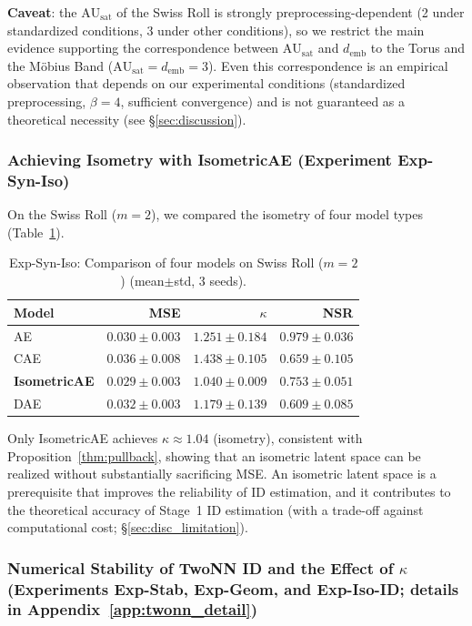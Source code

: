 \documentclass[make,article,submit,pdftex,moreauthors]{Definitions/mdpi}
\newcommand{\kap}{\kappa}
\newcommand{\AUsat}{\mathrm{AU}_{\mathrm{sat}}}
\newcommand{\demb}{d_{\mathrm{emb}}}
\begin{document}
\textbf{Caveat}: the $\AUsat$ of the Swiss Roll is strongly preprocessing-dependent
(2 under standardized conditions, 3 under other conditions), so we restrict the main
evidence supporting the correspondence between $\AUsat$ and $\demb$ to the Torus and
the M\"obius Band ($\AUsat = \demb = 3$).
Even this correspondence is an empirical observation that depends on our experimental
conditions (standardized preprocessing, $\beta = 4$, sufficient convergence) and is not
guaranteed as a theoretical necessity (see \S\ref{sec:discussion}).

\subsubsection{Achieving Isometry with IsometricAE (Experiment Exp-Syn-Iso)}

On the Swiss Roll ($m = 2$), we compared the isometry of four model types (Table~\ref{tab:ec}).

\begin{table}[H]
\centering
\caption{Exp-Syn-Iso: Comparison of four models on Swiss Roll ($m=2$) (mean$\pm$std, 3 seeds).}
\label{tab:ec}
\small
\begin{tabular}{lrrr}
\toprule
Model & MSE & $\kap$ & NSR \\
\midrule
AE & $0.030\pm0.003$ & $1.251\pm0.184$ & $0.979\pm0.036$ \\
CAE & $0.036\pm0.008$ & $1.438\pm0.105$ & $0.659\pm0.105$ \\
\textbf{IsometricAE} & $\boldsymbol{0.029\pm0.003}$ & $\boldsymbol{1.040\pm0.009}$ & $0.753\pm0.051$ \\
DAE & $0.032\pm0.003$ & $1.179\pm0.139$ & $0.609\pm0.085$ \\
\bottomrule
\end{tabular}
\end{table}

Only IsometricAE achieves $\kap \approx 1.04$ (isometry), consistent with Proposition~\ref{thm:pullback},
showing that an isometric latent space can be realized without substantially sacrificing MSE.
An isometric latent space is a prerequisite that improves the reliability of ID estimation,
and it contributes to the theoretical accuracy of Stage~1 ID estimation
(with a trade-off against computational cost; \S\ref{sec:disc_limitation}).

\subsubsection{Numerical Stability of TwoNN ID and the Effect of $\kap$ (Experiments Exp-Stab, Exp-Geom, and Exp-Iso-ID; details in Appendix~\ref{app:twonn_detail})}\label{sec:exp_ep}
\end{document}
